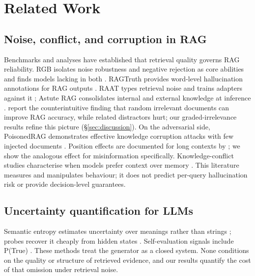 \documentclass[sn-basic]{sn-jnl}
\theoremstyle{thmstyleone}
\theoremstyle{thmstyletwo}
\begin{document}
\section{Related Work}\label{sec:related}

\subsection{Noise, conflict, and corruption in RAG}
Benchmarks and analyses have established that retrieval quality governs
RAG reliability. RGB isolates noise robustness and negative rejection
as core abilities and finds models lacking in both
\citep{chen2023rgb}. RAGTruth provides word-level hallucination
annotations for RAG outputs \citep{wu2024ragtruth}. RAAT types
retrieval noise and trains adapters against it \citep{fang2024raat};
Astute RAG consolidates internal and external knowledge at inference
\citep{wang2024astuterag}. \citet{cuconasu2024power} report the
counterintuitive finding that random irrelevant documents can improve
RAG accuracy, while related distractors hurt; our graded-irrelevance
results refine this picture (\S\ref{sec:discussion}). On the
adversarial side, PoisonedRAG demonstrates effective knowledge
corruption attacks with few injected documents
\citep{zou2025poisonedrag}. Position effects are documented for long
contexts by \citet{liu2024lost}; we show the analogous effect for
misinformation specifically. Knowledge-conflict studies characterise
when models prefer context over memory
\citep{xie2024adaptive,kortukov2024conflicts,xu2024survey}. This
literature measures and manipulates behaviour; it does not predict
per-query hallucination risk or provide decision-level guarantees.

\subsection{Uncertainty quantification for LLMs}
Semantic entropy estimates uncertainty over meanings rather than
strings \citep{kuhn2023semantic,farquhar2024nature}; probes recover it
cheaply from hidden states \citep{kossen2024sep}. Self-evaluation signals include P(True) \citep{kadavath2022language}. These methods treat the
generator as a closed system. None conditions on the quality or
structure of retrieved evidence, and our results quantify the cost of
that omission under retrieval noise.
\end{document}
